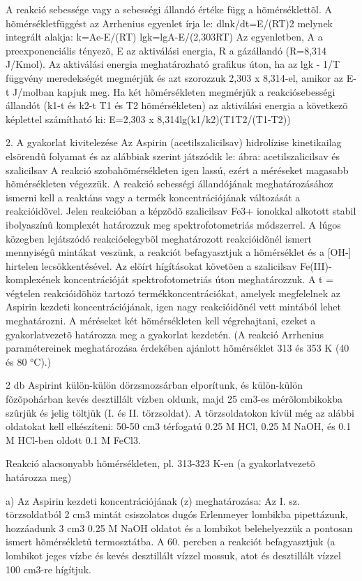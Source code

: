 \documentclass{article}
\begin{document}
A reakció sebessége vagy a sebességi állandó értéke függ a hõmérséklettõl.
A hõmérsékletfüggést az Arrhenius egyenlet írja le:
dlnk/dt=E/(RT)2
melynek integrált alakja:
k=Ae-E/(RT)
lgk=lgA-E/(2,303RT)
Az egyenletben, A a preexponenciális tényezõ, E az aktiválási energia, R a gázállandó (R=8,314 J/Kmol).
Az aktiválási energia meghatározható grafikus úton, ha az lgk - 1/T függvény meredekségét megmérjük és azt szorozzuk 2,303 x 8,314-el, amikor az E-t J/molban kapjuk meg.
Ha két hõmérsékleten megmérjük a reakciósebességi állandót (k1-t és k2-t T1 és T2 hõmérsékleten) az aktiválási energia a következõ képlettel számítható ki:
E=2,303 x 8,314lg(k1/k2)(T1T2/(T1-T2))

2. A gyakorlat kivitelezése
Az Aspirin (acetilszalicilsav) hidrolízise kinetikailag elsõrendû folyamat és az alábbiak szerint játszódik le:
ábra: acetilszalicilsav és szalicilsav
A reakció szobahõmérsékleten igen lassú, ezért a méréseket magasabb hõmérsékleten végezzük.
A reakció sebességi állandójának meghatározásához ismerni kell a reaktáns vagy a termék koncentrációjának változását a reakcióidõvel.
Jelen reakcióban a képzõdõ szalicilsav Fe3+ ionokkal alkotott stabil ibolyaszínû komplexét határozzuk meg spektrofotometriás módszerrel.
A lúgos közegben lejátszódó reakcióelegybõl meghatározott reakcióidõnél ismert mennyiségû mintákat veszünk, a reakciót befagyasztjuk a hõmérséklet és a [OH-] hirtelen lecsökkentésével.
Az elõírt hígításokat követõen a szalicilsav Fe(III)-komplexének koncentrációját spektrofotometriás úton meghatározzuk.
A t = végtelen reakcióidõhöz tartozó termékkoncentrációkat, amelyek megfelelnek az Aspirin kezdeti koncentrációjának, igen nagy reakcióidõnél vett mintából lehet meghatározni.
A méréseket két hõmérsékleten kell végrehajtani, ezeket a gyakorlatvezetõ határozza meg a gyakorlat kezdetén.
(A reakció Arrhenius paramétereinek meghatározása érdekében ajánlott hõmérséklet 313 és 353 K (40 és 80 °C).)

2 db Aspirint külön-külön dörzsmozsárban elporítunk, és külön-külön fõzõpohárban kevés desztillált vízben oldunk, majd 25 cm3-es mérõlombikokba szûrjük és jelig töltjük (I. és II. törzsoldat).
A törzsoldatokon kívül még az alábbi oldatokat kell elkészíteni: 50-50 cm3 térfogatú 0.25 M HCl, 0.25 M NaOH, és 0.1 M HCl-ben oldott 0.1 M FeCl3.


Reakció alacsonyabb hõmérsékleten, pl. 313-323 K-en (a gyakorlatvezetõ határozza meg)

a) Az Aspirin kezdeti koncentrációjának (z) meghatározása:
Az I. sz. törzsoldatból 2 cm3 mintát csiszolatos dugós Erlenmeyer lombikba pipettázunk, hozzáadunk 3 cm3 0.25 M NaOH oldatot és a lombikot belehelyezzük a pontosan ismert hõmérsékletû termosztátba. 
A 60. percben a reakciót befagyasztjuk (a lombikot jeges vízbe és kevés desztillált vízzel mossuk, atot és desztillált vízzel 100 cm3-re hígítjuk.
\end{document}
